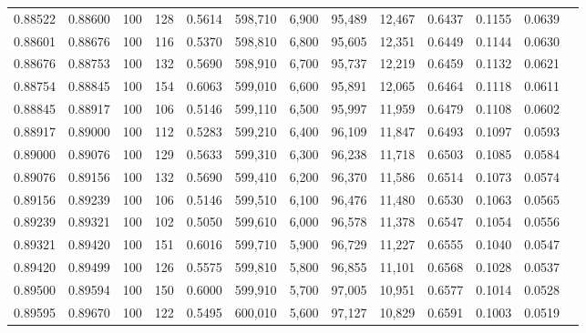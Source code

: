\begin{tabular}{rrrrrrrrrrrrr}
0.88522 & 0.88600 &   100 & 128 &                                     0.5614 & 598,710 &   6,900 &  95,489 &  12,467 & 0.6437 & 0.1155 & 0.0639 \\
0.88601 & 0.88676 &   100 & 116 &                                     0.5370 & 598,810 &   6,800 &  95,605 &  12,351 & 0.6449 & 0.1144 & 0.0630 \\
0.88676 & 0.88753 &   100 & 132 &                                     0.5690 & 598,910 &   6,700 &  95,737 &  12,219 & 0.6459 & 0.1132 & 0.0621 \\
0.88754 & 0.88845 &   100 & 154 &                                     0.6063 & 599,010 &   6,600 &  95,891 &  12,065 & 0.6464 & 0.1118 & 0.0611 \\
0.88845 & 0.88917 &   100 & 106 &                                     0.5146 & 599,110 &   6,500 &  95,997 &  11,959 & 0.6479 & 0.1108 & 0.0602 \\
0.88917 & 0.89000 &   100 & 112 &                                     0.5283 & 599,210 &   6,400 &  96,109 &  11,847 & 0.6493 & 0.1097 & 0.0593 \\
0.89000 & 0.89076 &   100 & 129 &                                     0.5633 & 599,310 &   6,300 &  96,238 &  11,718 & 0.6503 & 0.1085 & 0.0584 \\
0.89076 & 0.89156 &   100 & 132 &                                     0.5690 & 599,410 &   6,200 &  96,370 &  11,586 & 0.6514 & 0.1073 & 0.0574 \\
0.89156 & 0.89239 &   100 & 106 &                                     0.5146 & 599,510 &   6,100 &  96,476 &  11,480 & 0.6530 & 0.1063 & 0.0565 \\
0.89239 & 0.89321 &   100 & 102 &                                     0.5050 & 599,610 &   6,000 &  96,578 &  11,378 & 0.6547 & 0.1054 & 0.0556 \\
0.89321 & 0.89420 &   100 & 151 &                                     0.6016 & 599,710 &   5,900 &  96,729 &  11,227 & 0.6555 & 0.1040 & 0.0547 \\
0.89420 & 0.89499 &   100 & 126 &                                     0.5575 & 599,810 &   5,800 &  96,855 &  11,101 & 0.6568 & 0.1028 & 0.0537 \\
0.89500 & 0.89594 &   100 & 150 &                                     0.6000 & 599,910 &   5,700 &  97,005 &  10,951 & 0.6577 & 0.1014 & 0.0528 \\
0.89595 & 0.89670 &   100 & 122 &                                     0.5495 & 600,010 &   5,600 &  97,127 &  10,829 & 0.6591 & 0.1003 & 0.0519 \\

\end{tabular}
